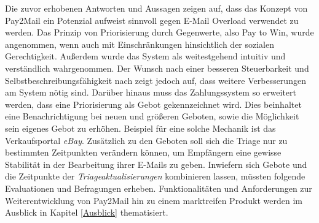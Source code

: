 Die zuvor erhobenen Antworten und Aussagen zeigen auf, dass das Konzept von Pay2Mail ein Potenzial aufweist sinnvoll gegen E-Mail Overload verwendet zu werden. Das Prinzip von Priorisierung durch Gegenwerte, also Pay to Win, wurde angenommen, wenn auch mit Einschränkungen hinsichtlich der sozialen Gerechtigkeit. Außerdem wurde das System als weitestgehend intuitiv und verständlich wahrgenommen. Der Wunsch nach einer besseren Steuerbarkeit und Selbstbeschreibungsfähigkeit nach \cite{ISO9241-110} zeigt jedoch auf, dass weitere Verbesserungen am System nötig sind. Darüber hinaus muss das Zahlungssystem so erweitert werden, dass eine Priorisierung als Gebot gekennzeichnet wird. Dies beinhaltet eine Benachrichtigung bei neuen und größeren Geboten, sowie die Möglichkeit sein eigenes Gebot zu erhöhen. Beispiel für eine solche Mechanik ist das Verkaufsportal \textit{eBay}. Zusätzlich zu den Geboten soll sich die Triage nur zu bestimmten Zeitpunkten verändern können, um Empfängern eine gewisse Stabilität in der Bearbeitung ihrer E-Mails zu geben. Inwiefern sich Gebote und die Zeitpunkte der \textit{Triageaktualisierungen} kombinieren lassen, müssten folgende Evaluationen und Befragungen erheben. Funktionalitäten und Anforderungen zur Weiterentwicklung von Pay2Mail hin zu einem marktreifen Produkt werden im Ausblick in Kapitel \ref{Ausblick} thematisiert.